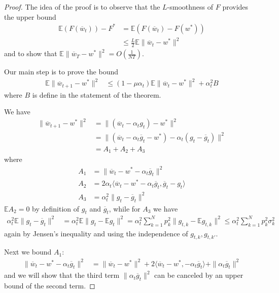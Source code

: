 \begin{proof}
	The idea of the proof is to observe that the $L$-smoothness of $F$
	provides the upper bound
	\begin{align*}
	\mathbb{E}(F(\overline{w}_{t}))-F^{\ast} & =\mathbb{E}(F(\overline{w}_{t})-F(w^{\ast}))\\
	& \leq\frac{L}{2}\mathbb{E}\|\overline{w}_{t}-w^{\ast}\|^{2}
	\end{align*}
	and to show that $\mathbb{E}\|\overline{w}_{T}-w^{\ast}\|^{2}=O(\frac{1}{NT})$. 
	
	Our main step is to prove the bound 
	\begin{align*}
	\mathbb{E}\|\overline{w}_{t+1}-w^{\ast}\|^{2} & \leq(1-\mu\alpha_{t})\mathbb{E}\|\overline{w}_{t}-w^{\ast}\|^{2}+\alpha_{t}^{2}B
	\end{align*}
	where $B$ is define in the statement of the theorem. 
	
	We have 
	\begin{align*}
	\|\overline{w}_{t+1}-w^{\ast}\|^{2} & =\|(\overline{w}_{t}-\alpha_{t}g_{t})-w^{\ast}\|^{2}\\
	& =\|(\overline{w}_{t}-\alpha_{t}\overline{g}_{t}-w^{\ast})-\alpha_{t}(g_{t}-\overline{g}_{t})\|^{2}\\
	& =A_{1}+A_{2}+A_{3}
	\end{align*}
	where 
	\begin{align*}
	A_{1} & =\|\overline{w}_{t}-w^{\ast}-\alpha_{t}\overline{g}_{t}\|^{2}\\
	A_{2} & =2\alpha_{t}\langle\overline{w}_{t}-w^{\ast}-\alpha_{t}\overline{g}_{t},\overline{g}_{t}-g_{t}\rangle\\
	A_{3} & =\alpha_{t}^{2}\|g_{t}-\overline{g}_{t}\|^{2}
	\end{align*}
	$\mathbb{E}A_{2}=0$ by definition of $g_{t}$ and $\overline{g}_{t}$,
	while for $A_{3}$ we have
	\begin{align*}
	\alpha_{t}^{2}\mathbb{E}\|g_{t}-\overline{g}_{t}\|^{2} & =\alpha_{t}^{2}\mathbb{E}\|g_{t}-\mathbb{E}g_{t}\|^{2}=\alpha_{t}^{2}\sum_{k=1}^{N}p_{k}^{2}\|g_{t,k}-\mathbb{E}g_{t,k}\|^{2}\leq\alpha_{t}^{2}\sum_{k=1}^{N}p_{k}^{2}\sigma_{k}^{2}
	\end{align*}
	again by Jensen's inequality and using the independence of $g_{t,k},g_{t,k'}$. 
	
	Next we bound $A_{1}$: 
	\begin{align*}
	\|\overline{w}_{t}-w^{\ast}-\alpha_{t}\overline{g}_{t}\|^{2} & =\|\overline{w}_{t}-w^{\ast}\|^{2}+2\langle\overline{w}_{t}-w^{\ast},-\alpha_{t}\overline{g}_{t}\rangle+\|\alpha_{t}\overline{g}_{t}\|^{2}
	\end{align*}
	and we will show that the third term $\|\alpha_{t}\overline{g}_{t}\|^{2}$
	can be canceled by an upper bound of the second term. %


\end{proof}
